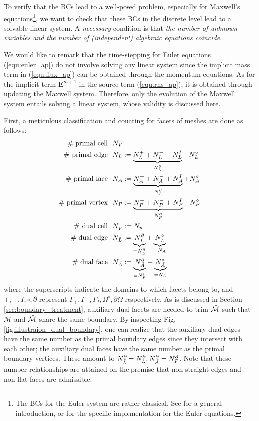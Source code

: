 \documentclass{report}
\begin{document}
To verify that the BCs lead to a well-posed problem, especially for Maxwell's equations\footnote{The BCs for the Euler system are rather classical. See \cite[][Chap. 7]{leveque_2002} for a general introduction, or \cite[][sec. 2e]{mishra_2019b} for the specific implementation for the Euler equations.}, we want to check that these BCs in the discrete level lead to a solvable linear system. A \emph{necessary} condition is that \emph{the number of unknown variables and the number of (independent) algebraic equations coincide}.

We would like to remark that the time-stepping for Euler equations (\ref{equ:euler_ap}) do not involve solving any linear system since the implicit mass term in (\ref{equ:flux_ap}) can be obtained through the momentum equations. As for the implicit term $\mathbf{E}^{m+1}$ in the source term (\ref{equ:rhs_ap}), it is obtained through updating the Maxwell system. Therefore, only the evolution of the Maxwell system entails solving a linear system, whose validity is discussed here.

First, a meticulous classification and counting for facets of meshes are done as follows:
\begin{align*}
    \#\  \text{primal cell}\ \  &N_V \\
    \#\  \text{primal edge}\ \  &N_L := \underbrace{N^+_L + N^-_L + N^I_L}_{N^\partial_L} + N^\circ_L  \\
    \#\  \text{primal face}\ \  &N_A := \underbrace{N_A^+ + N_A^- + N^I_A}_{N^\partial_A} + N^\circ_A  \\
    \#\  \text{primal vertex}\ \  &N_P := \underbrace{N_P^+ + N_P^- + N^I_P}_{N^\partial_P} + N^\circ_P \\
    \#\  \text{dual cell}\ \  &N_{\Tilde{V}} := N_p \\
    \#\  \text{dual edge}\ \  &N_{\Tilde{L}} := \underbrace{N^\partial_{\Tilde{L}}}_{=N^\partial_L} + \underbrace{N^\circ_{\Tilde{L}}}_{=N_A} \\
    \#\  \text{dual face}\ \  &N_{\Tilde{A}} := \underbrace{N^\partial_{\Tilde{A}}}_{=N^\partial_P} + \underbrace{N^\circ_{\Tilde{A}}}_{=N_L}
\end{align*}
where the superscripts indicate the domains to which facets belong to, and $+,-,I,\circ,\partial$ represent $\Gamma_+, \Gamma_-, \Gamma_I, \Omega^\circ, \partial \Omega$ respectively. As is discussed in Section \ref{sec:boundary_treatment}, auxiliary dual facets are needed to trim $\Tilde{\mathcal{M}}$ such that $\mathcal{M}$ and $\Tilde{\mathcal{M}}$ share the same boundary. By inspecting Fig. \ref{fig:illustraion_dual_boundary}, one can realize that the auxiliary dual edges have the same number as the primal boundary edges since they intersect with each other; the auxiliary dual faces have the same number as the primal boundary vertices. These amount to $N^\partial_{\Tilde{L}} = N^\partial_L, N^\partial_{\Tilde{A}} = N^\partial_P$. Note that these number relationships are attained on the premise that non-straight edges and non-flat faces are admissible.
\end{document}
